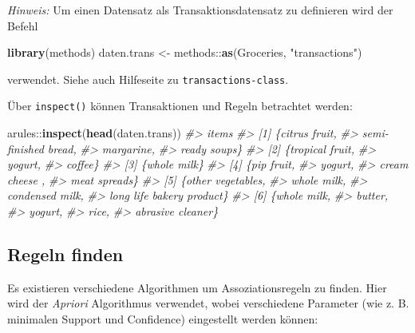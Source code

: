 \documentclass[12pt,]{book}
\makeatletter
\newenvironment{Shaded}{\begin{snugshade}}{\end{snugshade}}
\newcommand{\KeywordTok}[1]{\textcolor[rgb]{0.13,0.29,0.53}{\textbf{{#1}}}}
\newcommand{\StringTok}[1]{\textcolor[rgb]{0.31,0.60,0.02}{{#1}}}
\newcommand{\CommentTok}[1]{\textcolor[rgb]{0.56,0.35,0.01}{\textit{{#1}}}}
\newcommand{\NormalTok}[1]{{#1}}
\newenvironment{kframe}{%
\medskip{}
\setlength{\fboxsep}{.8em}
 \def\at@end@of@kframe{}%
 \ifinner\ifhmode%
  \def\at@end@of@kframe{\end{minipage}}%
  \begin{minipage}{\columnwidth}%
 \fi\fi%
 \def\FrameCommand##1{\hskip\@totalleftmargin \hskip-\fboxsep
 \colorbox{shadecolor}{##1}\hskip-\fboxsep
     \hskip-\linewidth \hskip-\@totalleftmargin \hskip\columnwidth}%
 \MakeFramed {\advance\hsize-\width
   \@totalleftmargin\z@ \linewidth\hsize
   \@setminipage}}%
 {\par\unskip\endMakeFramed%
 \at@end@of@kframe}
\renewenvironment{Shaded}{\begin{kframe}}{\end{kframe}}
\makeatother
\begin{document}
\emph{Hinweis:} Um einen Datensatz als Transaktionsdatensatz zu
definieren wird der Befehl

\begin{Shaded}
\begin{Highlighting}[]
\KeywordTok{library}\NormalTok{(methods)}
\NormalTok{daten.trans <-}\StringTok{ }\NormalTok{methods::}\KeywordTok{as}\NormalTok{(Groceries, }\StringTok{"transactions"}\NormalTok{)}
\end{Highlighting}
\end{Shaded}

verwendet. Siehe auch Hilfeseite zu \texttt{transactions-class}.

Über \texttt{inspect()} können Transaktionen und Regeln betrachtet
werden:

\begin{Shaded}
\begin{Highlighting}[]
\NormalTok{arules::}\KeywordTok{inspect}\NormalTok{(}\KeywordTok{head}\NormalTok{(daten.trans))}
\CommentTok{#>     items                     }
\CommentTok{#> [1] \{citrus fruit,            }
\CommentTok{#>      semi-finished bread,     }
\CommentTok{#>      margarine,               }
\CommentTok{#>      ready soups\}             }
\CommentTok{#> [2] \{tropical fruit,          }
\CommentTok{#>      yogurt,                  }
\CommentTok{#>      coffee\}                  }
\CommentTok{#> [3] \{whole milk\}              }
\CommentTok{#> [4] \{pip fruit,               }
\CommentTok{#>      yogurt,                  }
\CommentTok{#>      cream cheese ,           }
\CommentTok{#>      meat spreads\}            }
\CommentTok{#> [5] \{other vegetables,        }
\CommentTok{#>      whole milk,              }
\CommentTok{#>      condensed milk,          }
\CommentTok{#>      long life bakery product\}}
\CommentTok{#> [6] \{whole milk,              }
\CommentTok{#>      butter,                  }
\CommentTok{#>      yogurt,                  }
\CommentTok{#>      rice,                    }
\CommentTok{#>      abrasive cleaner\}}
\end{Highlighting}
\end{Shaded}

\subsection{Regeln finden}\label{regeln-finden}

Es existieren verschiedene Algorithmen um Assoziationsregeln zu finden.
Hier wird der \emph{Apriori} Algorithmus verwendet, wobei verschiedene
Parameter (wie z. B. minimalen Support und Confidence) eingestellt
werden können:
\end{document}
